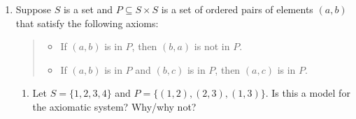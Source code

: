 \begin{exercises}{}{}
\begin{enumerate}
		
	
	
	
		\item Suppose $S$ is a set and $P\subseteq S\times S$ is a set of ordered pairs of elements $(a,b)$ that satisfy the following axioms:
	  \begin{quote}
	  \begin{itemize}
	  	\item[(A1)] If $(a,b)$ is in $P$, then $(b,a)$ is not in $P$.
	  	\item[(A2)] If $(a,b)$ is in $P$ and $(b,c)$ is in $P$, then $(a,c)$ is in $P$.
	  \end{itemize}
	  \end{quote}
	  \begin{enumerate}
	    \item Let $S=\{1,2,3,4\}$ and $P=\{(1,2),(2,3),(1,3)\}$. Is this a model for the axiomatic system? Why/why not?
	    

\end{enumerate}
\end{enumerate}
\end{exercises}
